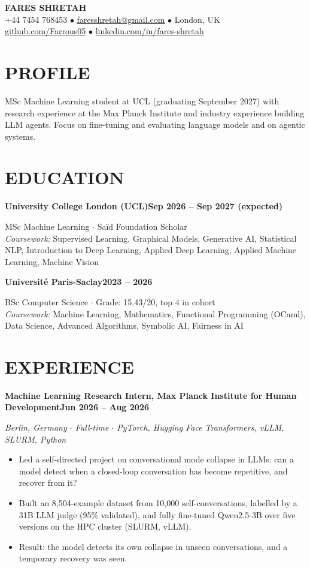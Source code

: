 \documentclass[10pt, a4paper]{article}
\newcommand{\entry}[2]{\vspace{5pt}\textbf{#1}\hfill\textbf{#2}\par}
\newcommand{\sub}[1]{\textit{#1}\par}
\begin{document}
\begin{center}
    {\huge \textbf{FARES SHRETAH}} \\[3pt]
    \small +44 7454 768453 $\bullet$ \href{mailto:faresshretah@gmail.com}{faresshretah@gmail.com} $\bullet$ London, UK \\
    \small \href{https://github.com/Farrous05}{github.com/Farrous05} $\bullet$ \href{https://www.linkedin.com/in/fares-shretah/}{linkedin.com/in/fares-shretah}
\end{center}

\section*{PROFILE}
MSc Machine Learning student at UCL (graduating September 2027) with research experience at the Max Planck Institute and industry experience building LLM agents. Focus on fine-tuning and evaluating language models and on agentic systems.

\section*{EDUCATION}
\entry{University College London (UCL)}{Sep 2026 -- Sep 2027 (expected)}
MSc Machine Learning $\cdot$ Sa\"id Foundation Scholar \\
\textit{Coursework:} Supervised Learning, Graphical Models, Generative AI, Statistical NLP, Introduction to Deep Learning, Applied Deep Learning, Applied Machine Learning, Machine Vision

\entry{Universit\'e Paris-Saclay}{2023 -- 2026}
BSc Computer Science $\cdot$ Grade: 15.43/20, top 4 in cohort \\
\textit{Coursework:} Machine Learning, Mathematics, Functional Programming (OCaml), Data Science, Advanced Algorithms, Symbolic AI, Fairness in AI

\section*{EXPERIENCE}
\entry{Machine Learning Research Intern, Max Planck Institute for Human Development}{Jun 2026 -- Aug 2026}
\sub{Berlin, Germany $\cdot$ Full-time $\cdot$ PyTorch, Hugging Face Transformers, vLLM, SLURM, Python}
\begin{itemize}
    \item Led a self-directed project on conversational mode collapse in LLMs: can a model detect when a closed-loop conversation has become repetitive, and recover from it?
    \item Built an 8,504-example dataset from 10,000 self-conversations, labelled by a 31B LLM judge (95\% validated), and fully fine-tuned Qwen2.5-3B over five versions on the HPC cluster (SLURM, vLLM).
    \item Result: the model detects its own collapse in unseen conversations, and a temporary recovery was seen.
\end{itemize}
\end{document}
